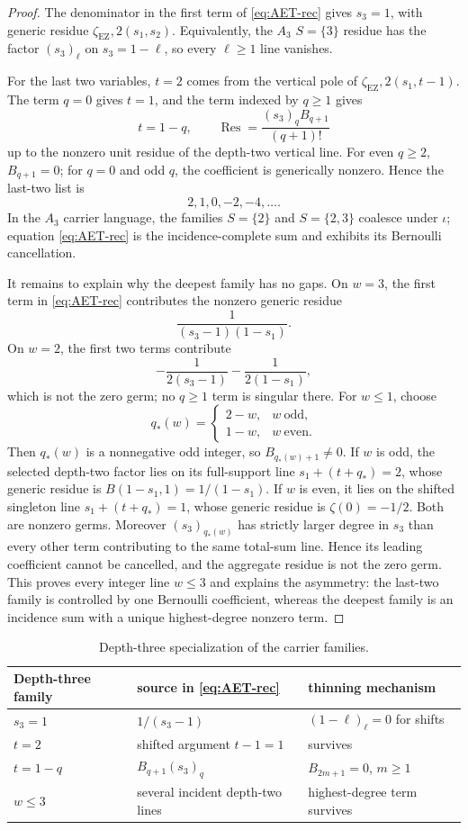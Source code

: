 \documentclass[11pt]{article}
\newcommand{\Res}{\operatorname*{Res}}
\newcommand{\EZ}{\zeta_{\mathrm{EZ}}}
\begin{document}
\begin{proof}
The denominator in the first term of \eqref{eq:AET-rec} gives
\(s_3=1\), with generic residue \(\EZ,2(s_1,s_2)\).
Equivalently, the \(A_3\) \(S=\{3\}\) residue has the factor
\((s_3)_\ell\) on \(s_3=1-\ell\), so every \(\ell\ge1\) line vanishes.

For the last two variables, \(t=2\) comes from the vertical pole of
\(\EZ,2(s_1,t-1)\).  The term \(q=0\) gives \(t=1\), and the term
indexed by \(q\ge1\) gives
\[
 t=1-q,\qquad
 \Res=\frac{(s_3)_qB_{q+1}}{(q+1)!}
\]
up to the nonzero unit residue of the depth-two vertical line.
For even \(q\ge2\), \(B_{q+1}=0\); for \(q=0\) and odd \(q\), the
coefficient is generically nonzero.  Hence the last-two list is
\[
 2,1,0,-2,-4,\ldots.
\]
In the \(A_3\) carrier language, the families \(S=\{2\}\) and
\(S=\{2,3\}\) coalesce under \(\iota\); equation
\eqref{eq:AET-rec} is the incidence-complete sum and exhibits its
Bernoulli cancellation.

It remains to explain why the deepest family has no gaps.  On
$w=3$, the first term in \eqref{eq:AET-rec} contributes the nonzero
generic residue
\[
 \frac{1}{(s_3-1)(1-s_1)}.
\]
On $w=2$, the first two terms contribute
\[
 -\frac{1}{2(s_3-1)}-\frac{1}{2(1-s_1)},
\]
which is not the zero germ; no $q\ge1$ term is singular there.  For
$w\le1$, choose
\[
 q_*(w)=
 \begin{cases}
 2-w,&w\ \text{odd},\\
 1-w,&w\ \text{even}.
 \end{cases}
\]
Then $q_*(w)$ is a nonnegative odd integer, so
$B_{q_*(w)+1}\ne0$.  If $w$ is odd, the selected depth-two factor lies
on its full-support line $s_1+(t+q_*)=2$, whose generic residue is
$B(1-s_1,1)=1/(1-s_1)$.  If $w$ is even, it lies on the shifted
singleton line $s_1+(t+q_*)=1$, whose generic residue is
$\zeta(0)=-1/2$.  Both are nonzero germs.  Moreover
$(s_3)_{q_*(w)}$ has strictly larger degree in $s_3$ than every other
term contributing to the same total-sum line.  Hence its leading
coefficient cannot be cancelled, and the aggregate residue is not the
zero germ.  This proves every integer line $w\le3$ and explains the
asymmetry: the last-two family is controlled by one Bernoulli
coefficient, whereas the deepest family is an incidence sum with a
unique highest-degree nonzero term.
\end{proof}

\begin{table}[ht]
\centering
\small
\begin{tabular}{@{}lll@{}}
\toprule
Depth-three family & source in \eqref{eq:AET-rec} & thinning mechanism\\
\midrule
\(s_3=1\) & \(1/(s_3-1)\) & \((1-\ell)_\ell=0\) for shifts\\
\(t=2\) & shifted argument \(t-1=1\) & survives\\
\(t=1-q\) & \(B_{q+1}(s_3)_q\) & \(B_{2m+1}=0\), \(m\ge1\)\\
\(w\le3\) & several incident depth-two lines & highest-degree term survives\\
\bottomrule
\end{tabular}
\caption{Depth-three specialization of the carrier families.}
\label{tab:EZ3}
\end{table}
\end{document}
